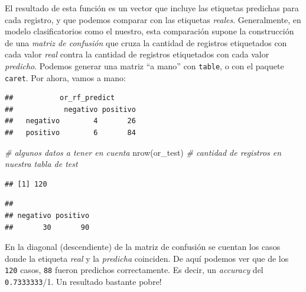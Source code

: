 \documentclass[
]{book}
\newenvironment{Shaded}{\begin{snugshade}}{\end{snugshade}}
\newcommand{\CommentTok}[1]{\textcolor[rgb]{0.56,0.35,0.01}{\textit{#1}}}
\newcommand{\FunctionTok}[1]{\textcolor[rgb]{0.00,0.00,0.00}{#1}}
\newcommand{\NormalTok}[1]{#1}
\newcommand{\SpecialCharTok}[1]{\textcolor[rgb]{0.00,0.00,0.00}{#1}}
\begin{document}
El resultado de esta función es un vector que incluye las etiquetas predichas para cada registro, y que podemos comparar con las etiquetas \emph{reales}. Generalmente, en modelo clasificatorios como el nuestro, esta comparación supone la construcción de una \emph{matriz de confusión} que cruza la cantidad de registros etiquetados con cada valor \emph{real} contra la cantidad de registros etiquetados con cada valor \emph{predicho}. Podemos generar una matriz ``a mano'' con \texttt{table}, o con el paquete \texttt{caret}. Por ahora, vamos a mano:

\begin{Shaded}
\end{Shaded}

\begin{verbatim}
##           or_rf_predict
##            negativo positivo
##   negativo        4       26
##   positivo        6       84
\end{verbatim}

\begin{Shaded}
\begin{Highlighting}[]
\CommentTok{\# algunos datos a tener en cuenta}
\FunctionTok{nrow}\NormalTok{(or\_test) }\CommentTok{\# cantidad de registros en nuestra tabla de test}
\end{Highlighting}
\end{Shaded}

\begin{verbatim}
## [1] 120
\end{verbatim}

\begin{Shaded}
\end{Shaded}

\begin{verbatim}
## 
## negativo positivo 
##       30       90
\end{verbatim}

En la diagonal (descendiente) de la matriz de confusión se cuentan los casos donde la etiqueta \emph{real} y la \emph{predicha} coinciden. De aquí podemos ver que de los \texttt{120} casos, \texttt{88} fueron predichos correctamente. Es decir, un \emph{accuracy} del \texttt{0.7333333}/1. Un resultado bastante pobre!
\end{document}
